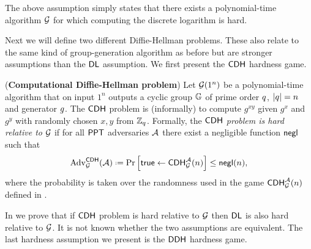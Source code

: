 The above assumption simply states that there exists a polynomial-time algorithm $\operatorname{\mathcal{G}}$ for which computing the discrete logarithm is hard. 

Next we will define two different Diffie-Hellman problems. These also relate to the same kind of group-generation algorithm as before but are stronger assumptions than the $\mathsf{DL}$ assumption. We first present the $\mathsf{CDH}$ hardness game. 

\begin{defn} 
(\textbf{Computational Diffie-Hellman problem}) Let $\operatorname{\mathcal{G}}(1^n)$ be a polynomial-time algorithm that on input $1^n$ outputs a cyclic group $\mathbb{G}$ of prime order $q$, $\vert q\vert = n$ and generator $g$. The $\mathsf{CDH}$ problem is (informally) to compute $g^{xy}$ given $g^x$ and $g^y$ with randomly chosen $x,y$ from $\mathbb{Z}_q$. Formally, the \textit{$\mathsf{CDH}$ problem is hard relative to} $\operatorname{\mathcal{G}}$ if for all $\mathsf{PPT}$ adversaries $\mathcal{A}$ there exist a negligible function $\operatorname{\mathsf{negl}}$ such that 
\begin{align*}
	\adv_{\groupgen}^{\CDH}(\adve)\defeq \prob{\true\leftarrow \CDH_{\groupgen}^{\adve}(n)} \leq \negl(n),
\end{align*}
where the probability is taken over the randomness used in the game $\mathsf{CDH}_{\operatorname{\mathcal{G}}}^{\mathcal{A}}(n)$ defined in .
\end{defn}

In  we prove that if $\mathsf{CDH}$ problem is hard relative to $\operatorname{\mathcal{G}}$ then $\mathsf{DL}$ is also hard relative to $\operatorname{\mathcal{G}}$. It is not known whether the two assumptions are equivalent. The last hardness assumption we present is the $\mathsf{DDH}$ hardness game. 

